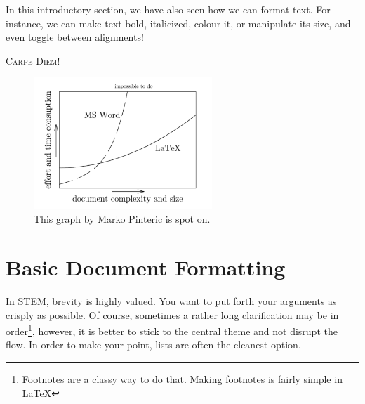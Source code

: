 \documentclass[a4paper]{article}
\begin{document}
{\large
    In this introductory section, we have also seen how we can format text. For instance, we can make text bold, italicized, colour it, or manipulate its size, and even toggle between alignments!} \par\medskip
\singlespacing
\begin{flushright}
    \LARGE\textsc{\textcolor[HTML]{99000C}{Carpe Diem!}} %
\end{flushright}
\begin{figure}[H]
    \includegraphics[width=0.6\textwidth]{ease-graph.png}
    \centering
    \caption{This graph by Marko Pinteric is spot on.}
\end{figure}

\newpage
\section{Basic Document Formatting}
In STEM, brevity is highly valued. You want to put forth your arguments as crisply as possible. Of course, sometimes a rather long clarification may be in order\footnote{Footnotes are a classy way to do that. Making footnotes is fairly simple in \LaTeX{}}, however, it is better to stick to the central theme and not disrupt the flow. In order to make your point, lists are often the cleanest option.

\renewcommand*{\thefootnote}{\fnsymbol{footnote}}
\end{document}

